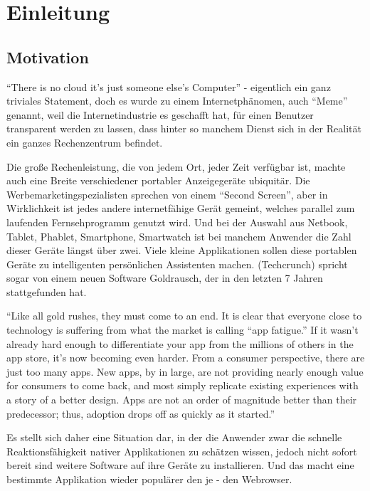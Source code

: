 \chapter{Einleitung}

\section{Motivation}
\label{sec:motivation}

 \enquote{There is no cloud it's just someone else's Computer} - eigentlich ein ganz triviales Statement, doch es wurde zu einem Internetphänomen, auch \enquote{Meme} genannt, weil die Internetindustrie es geschafft hat, für einen Benutzer transparent werden zu lassen, dass hinter so manchem Dienst sich in der Realität ein ganzes Rechenzentrum befindet.

Die große Rechenleistung, die von jedem Ort, jeder Zeit verfügbar ist, machte auch eine Breite verschiedener portabler Anzeigegeräte ubiquitär. Die Werbemarketingspezialisten sprechen von einem \enquote{Second Screen}, aber in Wirklichkeit ist jedes andere internetfähige Gerät gemeint, welches parallel zum laufenden Fernsehprogramm genutzt wird. Und bei der Auswahl aus Netbook, Tablet, Phablet, Smartphone, Smartwatch ist bei manchem Anwender die Zahl dieser Geräte längst über zwei. Viele kleine Applikationen sollen diese portablen Geräte zu intelligenten persönlichen Assistenten machen. (Techcrunch) spricht sogar von einem neuen Software Goldrausch, der in den letzten 7 Jahren stattgefunden hat.

\enquote{Like all gold rushes, they must come to an end. It is clear that everyone close to technology is suffering from what the market is calling “app fatigue.” If it wasn’t already hard enough to differentiate your app from the millions of others in the app store, it’s now becoming even harder. From a consumer perspective, there are just too many apps. New apps, by in large, are not providing nearly enough value for consumers to come back, and most simply replicate existing experiences with a story of a better design. Apps are not an order of magnitude better than their predecessor; thus, adoption drops off as quickly as it started.}\cite{Schippers:2006}

Es stellt sich daher eine Situation dar, in der die Anwender zwar die schnelle Reaktionsfähigkeit nativer Applikationen zu schätzen wissen, jedoch nicht sofort bereit sind weitere Software auf ihre Geräte zu installieren. Und das macht eine bestimmte Applikation wieder populärer den je - den Webrowser.

